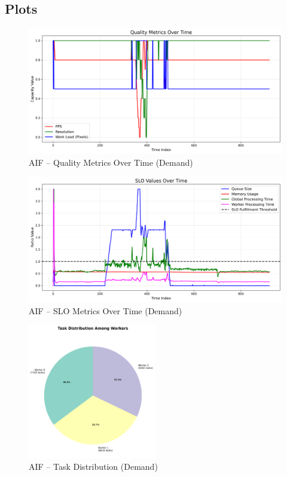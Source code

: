 \subsection*{Plots}
\begin{figure}[h]
    \centering
    \includegraphics[width=\textwidth]{img/results/variable_computational_demand_sim/active_inference_relative_control_quality_metrics.png}
    \caption{AIF – Quality Metrics Over Time (Demand)}
\end{figure}
\begin{figure}[h]
    \centering
    \includegraphics[width=\textwidth]{img/results/variable_computational_demand_sim/active_inference_relative_control_slo_values.png}
    \caption{AIF – SLO Metrics Over Time (Demand)}
\end{figure}
\begin{figure}[h]
    \centering
    \includegraphics[width=0.5\textwidth]{img/results/variable_computational_demand_sim/active_inference_relative_control_task_distribution_pie.png}
    \caption{AIF – Task Distribution (Demand)}
\end{figure}
